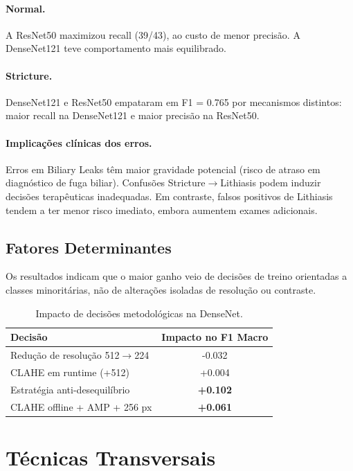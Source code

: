 \documentclass[runningheads]{llncs}
\begin{document}
\paragraph{Normal.}
A ResNet50 maximizou recall (39/43), ao custo de menor precisão. A DenseNet121
teve comportamento mais equilibrado.

\paragraph{Stricture.}
DenseNet121 e ResNet50 empataram em F1 = 0.765 por mecanismos distintos:
maior recall na DenseNet121 e maior precisão na ResNet50.

\paragraph{Implicações clínicas dos erros.}
Erros em Biliary Leaks têm maior gravidade potencial (risco de atraso em
diagnóstico de fuga biliar). Confusões Stricture\(\rightarrow\)Lithiasis podem
induzir decisões terapêuticas inadequadas. Em contraste, falsos positivos de
Lithiasis tendem a ter menor risco imediato, embora aumentem exames adicionais.

\subsection{Fatores Determinantes}
Os resultados indicam que o maior ganho veio de decisões de treino orientadas a
classes minoritárias, não de alterações isoladas de resolução ou contraste.

\begin{table}[ht]
\caption{Impacto de decisões metodológicas na DenseNet.}
\label{tab:impact_dense}
\centering
\begin{tabular}{lc}
\hline
Decisão & Impacto no F1 Macro \\
\hline
Redução de resolução 512\(\rightarrow\)224 & -0.032 \\
CLAHE em runtime (+512) & +0.004 \\
Estratégia anti-desequilíbrio & \textbf{+0.102} \\
CLAHE offline + AMP + 256 px & \textbf{+0.061} \\
\hline
\end{tabular}
\end{table}

\section{Técnicas Transversais}
\end{document}

